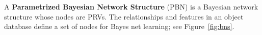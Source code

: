 \documentclass[conference]{IEEEtran}
\begin{document}
A \textbf{Parametrized Bayesian Network Structure} (PBN) is a Bayesian network structure  whose nodes are PRVs. 
%
The relationships and features in an object database define a set of nodes for Bayes net learning; see Figure~\ref{fig:bns}.







%
\end{document}
